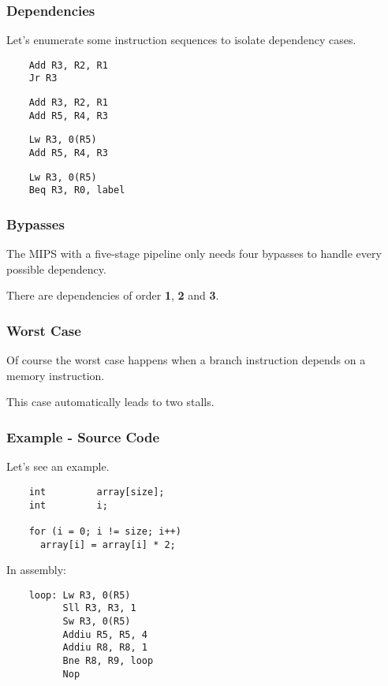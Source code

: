 
\begin{frame}[containsverbatim]
  \frametitle{Dependencies}

  Let's enumerate some instruction sequences to isolate dependency
  cases.

  \begin{verbatim}
    Add R3, R2, R1
    Jr R3
  \end{verbatim}

  \begin{verbatim}
    Add R3, R2, R1
    Add R5, R4, R3
  \end{verbatim}

  \begin{verbatim}
    Lw R3, 0(R5)
    Add R5, R4, R3
  \end{verbatim}

  \begin{verbatim}
    Lw R3, 0(R5)
    Beq R3, R0, label
  \end{verbatim}
\end{frame}


\begin{frame}
  \frametitle{Bypasses}

  The MIPS with a five-stage pipeline only needs four bypasses to
  handle every possible dependency.

  \-

  There are dependencies of order \textbf{1}, \textbf{2} and \textbf{3}.

  \begin{center}
  \end{center}
\end{frame}


\begin{frame}
  \frametitle{Worst Case}

  Of course the worst case happens when a branch instruction depends on
  a memory instruction.

  \-

  This case automatically leads to two stalls.
\end{frame}


\begin{frame}[containsverbatim]
  \frametitle{Example - Source Code}

  Let's see an example.

  \begin{verbatim}
    int         array[size];
    int         i;

    for (i = 0; i != size; i++)
      array[i] = array[i] * 2;
  \end{verbatim}

  In assembly:

  \begin{verbatim}
    loop: Lw R3, 0(R5)
          Sll R3, R3, 1
          Sw R3, 0(R5)
          Addiu R5, R5, 4
          Addiu R8, R8, 1
          Bne R8, R9, loop
          Nop
  \end{verbatim}
\end{frame}

